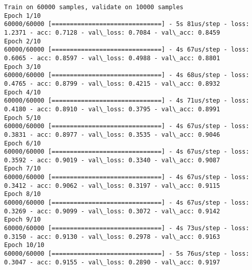 \documentclass[11pt]{article}
\begin{document}
    \begin{Verbatim}[commandchars=\\\{\}]
Train on 60000 samples, validate on 10000 samples
Epoch 1/10
60000/60000 [==============================] - 5s 81us/step - loss: 1.2371 - acc: 0.7128 - val\_loss: 0.7084 - val\_acc: 0.8459
Epoch 2/10
60000/60000 [==============================] - 4s 67us/step - loss: 0.6065 - acc: 0.8597 - val\_loss: 0.4988 - val\_acc: 0.8801
Epoch 3/10
60000/60000 [==============================] - 4s 68us/step - loss: 0.4765 - acc: 0.8799 - val\_loss: 0.4215 - val\_acc: 0.8932
Epoch 4/10
60000/60000 [==============================] - 4s 71us/step - loss: 0.4180 - acc: 0.8910 - val\_loss: 0.3795 - val\_acc: 0.8991
Epoch 5/10
60000/60000 [==============================] - 4s 67us/step - loss: 0.3831 - acc: 0.8977 - val\_loss: 0.3535 - val\_acc: 0.9046
Epoch 6/10
60000/60000 [==============================] - 4s 67us/step - loss: 0.3592 - acc: 0.9019 - val\_loss: 0.3340 - val\_acc: 0.9087
Epoch 7/10
60000/60000 [==============================] - 4s 67us/step - loss: 0.3412 - acc: 0.9062 - val\_loss: 0.3197 - val\_acc: 0.9115
Epoch 8/10
60000/60000 [==============================] - 4s 67us/step - loss: 0.3269 - acc: 0.9099 - val\_loss: 0.3072 - val\_acc: 0.9142
Epoch 9/10
60000/60000 [==============================] - 4s 73us/step - loss: 0.3150 - acc: 0.9130 - val\_loss: 0.2978 - val\_acc: 0.9163
Epoch 10/10
60000/60000 [==============================] - 5s 76us/step - loss: 0.3047 - acc: 0.9155 - val\_loss: 0.2890 - val\_acc: 0.9197

    \end{Verbatim}

    \begin{center}
    \end{center}
    { \hspace*{\fill} \\}
    
\end{document}
